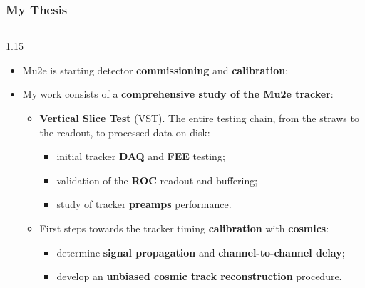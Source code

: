 \documentclass{beamer}
\begin{document}
\begin{frame}
    \frametitle{My Thesis}
    
\begin{columns}
   \begin{column}{1.15\framewidth} 
         \setlength{\leftmargini}{1.3em}
\vspace{-4mm}
\begin{itemize}
\item Mu2e is starting detector \textbf{commissioning} and \textbf{calibration};
     \vspace{2mm}
\item My work consists of a \textbf{comprehensive study of the Mu2e tracker}:
\vspace{1.8mm}
  \begin{itemize}
    \item \textbf{Vertical Slice Test} (VST). The entire 
testing chain, from the straws to the readout, to processed data on disk:
     \vspace{1mm}
 \begin{itemize}
     \item initial tracker \textbf{DAQ} and \textbf{FEE} testing;
          \vspace{1mm}
     \item validation of the \textbf{ROC} readout and buffering;
          \vspace{1mm}
     \item study of tracker \textbf{preamps} performance.
     \end{itemize}
     \vspace{1.8mm}

    \item First steps towards the tracker timing \textbf{calibration} with \textbf{cosmics}:
         \vspace{1mm}
    \begin{itemize}
            \item determine \textbf{signal propagation} and \textbf{channel-to-channel delay};
                 \vspace{1mm}
            \item develop an \textbf{unbiased cosmic track reconstruction} procedure.
    \end{itemize}
         \vspace{1.8mm}


\end{itemize}
\end{itemize}
\end{column}
\end{columns}
\end{frame}
\end{document}
